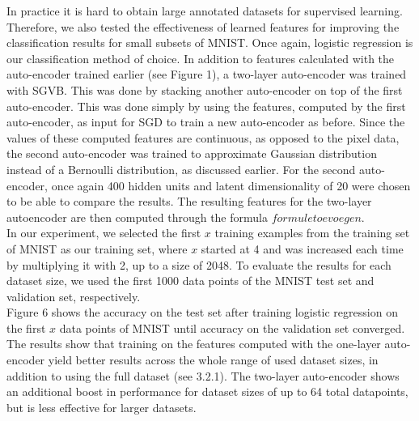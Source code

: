 \documentclass{article}
\begin{document}
In practice it is hard to obtain large annotated datasets for supervised learning. Therefore, we also tested the effectiveness of learned features for improving the classification results for small subsets of MNIST. Once again, logistic regression is our classification method of choice. In addition to features calculated with the auto-encoder trained earlier (see Figure 1), a two-layer auto-encoder was trained with SGVB. This was done by stacking another auto-encoder on top of the first auto-encoder. This was done simply by using the features, computed by the first auto-encoder, as input for SGD to train a new auto-encoder as before. Since the values of these computed features are continuous, as opposed to the pixel data, the second auto-encoder was trained to approximate Gaussian distribution instead of a Bernoulli distribution, as discussed earlier. For the second auto-encoder, once again 400 hidden units and latent dimensionality of 20 were chosen to be able to compare the results. The resulting features for the two-layer autoencoder are then computed through the formula $formule toevoegen$.\\ 
In our experiment, we selected the first $x$ training examples from the training set of MNIST as our training set, where $x$ started at 4 and was increased each time by multiplying it with 2, up to a size of 2048. To evaluate the results for each dataset size, we used the first 1000 data points of the MNIST test set and validation set, respectively.\\
Figure 6 shows the accuracy on the test set after training logistic regression on the first $x$ data points of MNIST until accuracy on the validation set converged. The results show that training on the features computed with the one-layer auto-encoder yield better results across the whole range of used dataset sizes, in addition to using the full dataset (see 3.2.1). The two-layer auto-encoder shows an additional boost in performance for dataset sizes of up to 64 total datapoints, but is less effective for larger datasets. \\
\end{document}
